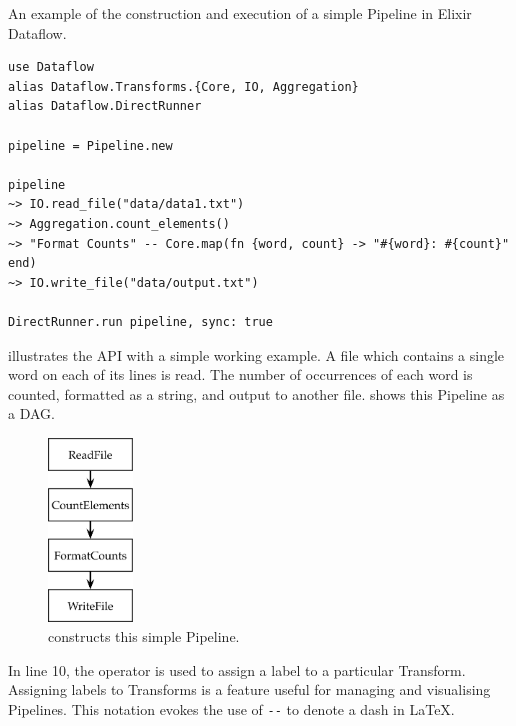 \begin{listing}[h]
	\caption[An example of Pipeline construction in Elixir.]{An example of the construction and execution of a simple Pipeline in Elixir Dataflow.}
	\label{lst:impl:elixir-construct-pipeline}
	\begin{verbatim}
use Dataflow
alias Dataflow.Transforms.{Core, IO, Aggregation}
alias Dataflow.DirectRunner

pipeline = Pipeline.new

pipeline
~> IO.read_file("data/data1.txt")
~> Aggregation.count_elements()
~> "Format Counts" -- Core.map(fn {word, count} -> "#{word}: #{count}" end)
~> IO.write_file("data/output.txt")

DirectRunner.run pipeline, sync: true

	\end{verbatim}
\end{listing}

 illustrates the API with a simple working example.
A file which contains a single word on each of its lines is read.
The number of occurrences of each word is counted, formatted as a string, and output to another file.
 shows this Pipeline as a DAG.

\begin{figure}[h]
	\centering
	\includegraphics[width=0.2\textwidth]{images/diags/dsl-simple-pipeline}
	\caption[A simple Pipeline constructed in \cref{lst:impl:elixir-construct-pipeline}.]{ constructs this simple Pipeline.}
	\label{fig:impl:dsl-simple-pipeline}
\end{figure}

In line 10, the \exs{--} operator is used to assign a label to a particular Transform.
Assigning labels to Transforms is a feature useful for managing and visualising Pipelines.
This notation evokes the use of \verb|--| to denote a dash in \LaTeX.

